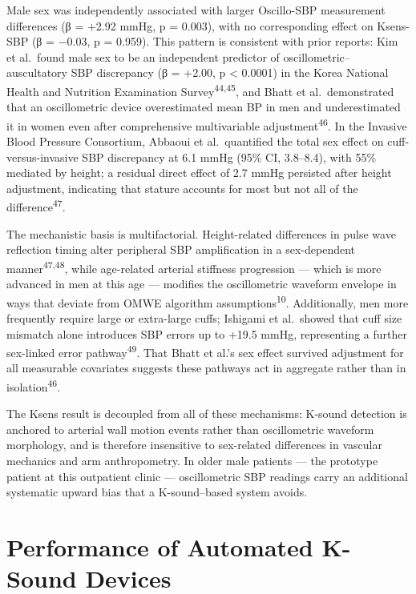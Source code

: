 \documentclass[
  12pt,
  letterpaper,
  openany,
  oneside]{book}
\begin{document}
Male sex was independently associated with larger Oscillo-SBP
measurement differences (β = +2.92 mmHg, p = 0.003), with no
corresponding effect on Ksens-SBP (β = −0.03, p = 0.959). This pattern
is consistent with prior reports: Kim et al.~found male sex to be an
independent predictor of oscillometric--auscultatory SBP discrepancy (β
= +2.00, p \textless{} 0.0001) in the Korea National Health and
Nutrition Examination Survey\textsuperscript{44,45}, and Bhatt et
al.~demonstrated that an oscillometric device overestimated mean BP in
men and underestimated it in women even after comprehensive
multivariable adjustment\textsuperscript{46}. In the Invasive Blood
Pressure Consortium, Abbaoui et al.~quantified the total sex effect on
cuff-versus-invasive SBP discrepancy at 6.1 mmHg (95\% CI, 3.8--8.4),
with 55\% mediated by height; a residual direct effect of 2.7 mmHg
persisted after height adjustment, indicating that stature accounts for
most but not all of the difference\textsuperscript{47}.

The mechanistic basis is multifactorial. Height-related differences in
pulse wave reflection timing alter peripheral SBP amplification in a
sex-dependent manner\textsuperscript{47,48}, while age-related arterial
stiffness progression --- which is more advanced in men at this age ---
modifies the oscillometric waveform envelope in ways that deviate from
OMWE algorithm assumptions\textsuperscript{10}. Additionally, men more
frequently require large or extra-large cuffs; Ishigami et al.~showed
that cuff size mismatch alone introduces SBP errors up to +19.5 mmHg,
representing a further sex-linked error pathway\textsuperscript{49}.
That Bhatt et al.'s sex effect survived adjustment for all measurable
covariates suggests these pathways act in aggregate rather than in
isolation\textsuperscript{46}.

The Ksens result is decoupled from all of these mechanisms: K-sound
detection is anchored to arterial wall motion events rather than
oscillometric waveform morphology, and is therefore insensitive to
sex-related differences in vascular mechanics and arm anthropometry. In
older male patients --- the prototype patient at this outpatient clinic
--- oscillometric SBP readings carry an additional systematic upward
bias that a K-sound--based system avoids.

\section{Performance of Automated K-Sound
Devices}\label{performance-of-automated-k-sound-devices}
\end{document}
